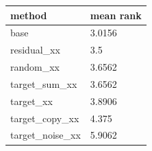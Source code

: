 \begin{tabular}{ll}
\toprule
method & mean rank \\
\midrule
base & 3.0156 \\
residual\_xx & 3.5 \\
random\_xx & 3.6562 \\
target\_sum\_xx & 3.6562 \\
target\_xx & 3.8906 \\
target\_copy\_xx & 4.375 \\
target\_noise\_xx & 5.9062 \\
\bottomrule
\end{tabular}
